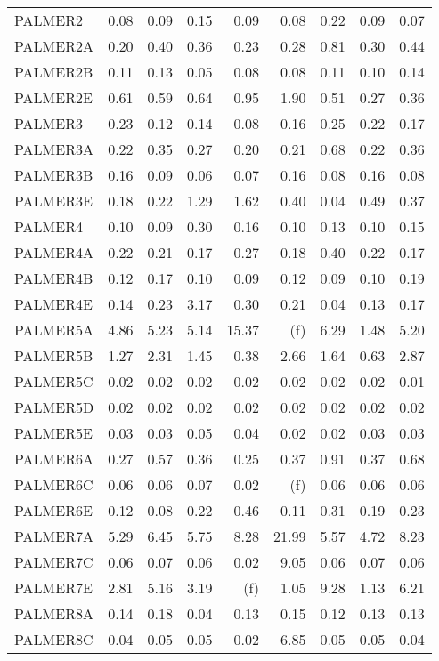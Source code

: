 \documentclass[11pt,twoside]{article}
\begin{document}
{\begin{longtable}[c]{|l|r|r|r|r|r|r|r|r|}
PALMER2 & 0.08 & 0.09 & 0.15 & 0.09 & 0.08 & 0.22 & 0.09 & 0.07 \\
PALMER2A & 0.20 & 0.40 & 0.36 & 0.23 & 0.28 & 0.81 & 0.30 & 0.44 \\
PALMER2B & 0.11 & 0.13 & 0.05 & 0.08 & 0.08 & 0.11 & 0.10 & 0.14 \\
PALMER2E & 0.61 & 0.59 & 0.64 & 0.95 & 1.90 & 0.51 & 0.27 & 0.36 \\
PALMER3 & 0.23 & 0.12 & 0.14 & 0.08 & 0.16 & 0.25 & 0.22 & 0.17 \\
PALMER3A & 0.22 & 0.35 & 0.27 & 0.20 & 0.21 & 0.68 & 0.22 & 0.36 \\
PALMER3B & 0.16 & 0.09 & 0.06 & 0.07 & 0.16 & 0.08 & 0.16 & 0.08 \\
PALMER3E & 0.18 & 0.22 & 1.29 & 1.62 & 0.40 & 0.04 & 0.49 & 0.37 \\
PALMER4 & 0.10 & 0.09 & 0.30 & 0.16 & 0.10 & 0.13 & 0.10 & 0.15 \\
PALMER4A & 0.22 & 0.21 & 0.17 & 0.27 & 0.18 & 0.40 & 0.22 & 0.17 \\
PALMER4B & 0.12 & 0.17 & 0.10 & 0.09 & 0.12 & 0.09 & 0.10 & 0.19 \\
PALMER4E & 0.14 & 0.23 & 3.17 & 0.30 & 0.21 & 0.04 & 0.13 & 0.17 \\
PALMER5A & 4.86 & 5.23 & 5.14 & 15.37 & (f) & 6.29 & 1.48 & 5.20 \\
PALMER5B & 1.27 & 2.31 & 1.45 & 0.38 & 2.66 & 1.64 & 0.63 & 2.87 \\
PALMER5C & 0.02 & 0.02 & 0.02 & 0.02 & 0.02 & 0.02 & 0.02 & 0.01 \\
PALMER5D & 0.02 & 0.02 & 0.02 & 0.02 & 0.02 & 0.02 & 0.02 & 0.02 \\
PALMER5E & 0.03 & 0.03 & 0.05 & 0.04 & 0.02 & 0.02 & 0.03 & 0.03 \\
PALMER6A & 0.27 & 0.57 & 0.36 & 0.25 & 0.37 & 0.91 & 0.37 & 0.68 \\
PALMER6C & 0.06 & 0.06 & 0.07 & 0.02 & (f) & 0.06 & 0.06 & 0.06 \\
PALMER6E & 0.12 & 0.08 & 0.22 & 0.46 & 0.11 & 0.31 & 0.19 & 0.23 \\
PALMER7A & 5.29 & 6.45 & 5.75 & 8.28 & 21.99 & 5.57 & 4.72 & 8.23 \\
PALMER7C & 0.06 & 0.07 & 0.06 & 0.02 & 9.05 & 0.06 & 0.07 & 0.06 \\
PALMER7E & 2.81 & 5.16 & 3.19 & (f) & 1.05 & 9.28 & 1.13 & 6.21 \\
PALMER8A & 0.14 & 0.18 & 0.04 & 0.13 & 0.15 & 0.12 & 0.13 & 0.13 \\
PALMER8C & 0.04 & 0.05 & 0.05 & 0.02 & 6.85 & 0.05 & 0.05 & 0.04 \\

\end{longtable}}
\end{document}
